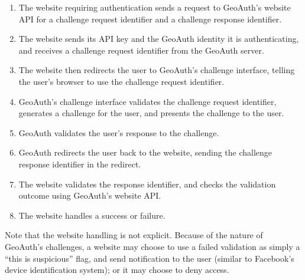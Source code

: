 \documentclass[11pt]{article} %
\begin{document}
\begin{enumerate}
\item The website requiring authentication sends a request to GeoAuth's website API for a challenge request identifier and a challenge response identifier.
\item The website sends its API key and the GeoAuth identity it is authenticating, and receives a challenge request identifier from the GeoAuth server.
\item The website then redirects the user to GeoAuth's challenge interface, telling the user's browser to use the challenge request identifier.
\item GeoAuth's challenge interface validates the challenge request identifier, generates a challenge for the user, and presents the challenge to the user.
\item GeoAuth validates the user's response to the challenge.
\item GeoAuth redirects the user back to the website, sending the challenge response identifier in the redirect.
\item The website validates the response identifier, and checks the validation outcome using GeoAuth's website API.
\item The website handles a success or failure.
\end{enumerate}

Note that the website handling is not explicit. Because of the nature of GeoAuth's challenges, a website may choose to use a failed validation as simply a ``this is suspicious'' flag, and send notification to the user (similar to Facebook's device identification system); or it may choose to deny access.
\end{document}
